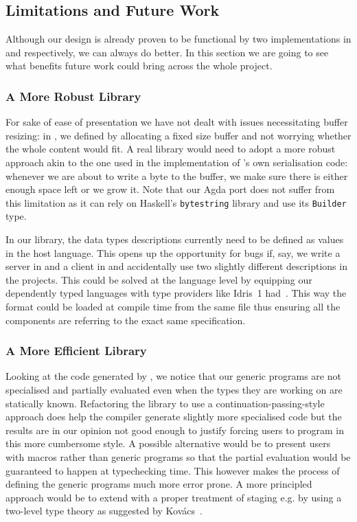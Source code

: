 \subsection{Limitations and Future Work}

Although our design is already proven to be functional by two implementations
in \idris{} and \agda{} respectively, we can always do better.
%
In this section we are going to see what benefits future work could bring
across the whole project.

\subsubsection{A More Robust Library}\label{sec:limitation-robust}

For sake of ease of presentation we have not dealt with issues necessitating
buffer resizing: in ,
we defined 
by allocating a fixed size buffer and not worrying whether the whole content
would fit.
%
A real library would need to adopt a more robust approach
akin to the one used in the implementation of \idris{}'s own serialisation
code: whenever we are about to write a byte to the buffer, we make sure there
is either enough space left or we grow it.
%
Note that our Agda port does not suffer from this limitation as it
can rely on Haskell's {\usestt\texttt{bytestring}} library and use its
{\usestt\texttt{Builder}} type.

In our library, the data types descriptions currently need to be defined
as values in the host language.
%
This opens up the opportunity for bugs if, say, we write a server in
\idris{} and a client in \agda{} and accidentally use two slightly
different descriptions in the projects.
%
This could be solved at the language level by equipping our dependently typed
languages with type providers like Idris~1 had~\citep{DBLP:conf/icfp/Christiansen13}.
%
This way the format could be loaded at compile time from the same file thus
ensuring all the components are referring to the exact same specification.


\subsubsection{A More Efficient Library}

Looking at the code generated by \idris{}, we notice that our generic programs
are not specialised and partially evaluated even when the types they are working
on are statically known.
%
Refactoring the library to use a continuation-passing-style approach does help
the compiler generate slightly more specialised code but the results are in our
opinion not good enough to justify forcing users to program in this more
cumbersome style.
%
A possible alternative would be to present users with macros rather than
generic programs so that the partial evaluation would be guaranteed to
happen at typechecking time. This however makes the process of defining
the generic programs much more error prone.
%
A more principled approach would be to extend \idris{} with a proper
treatment of staging e.g. by using a two-level type theory as suggested
by Kov{\'{a}}cs~\citep{DBLP:journals/pacmpl/Kovacs22}.

